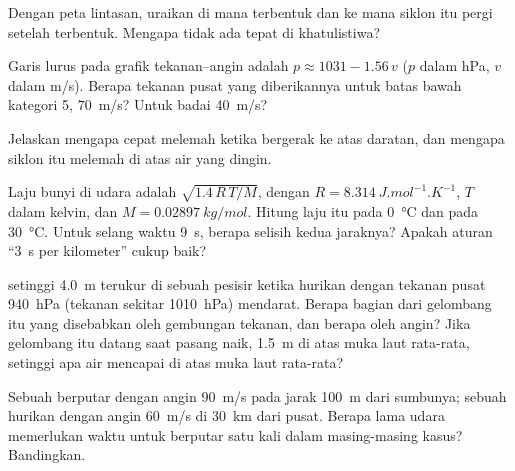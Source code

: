 \begin{exercise}[$\star\star$]\label{exo:g10:storms-and-cyclones:9}
Dengan peta lintasan, uraikan di mana  terbentuk dan ke mana
siklon itu pergi setelah terbentuk. Mengapa  tidak ada tepat di
khatulistiwa?
\end{exercise}

\begin{exercise}[$\star\star$]\label{exo:g10:storms-and-cyclones:10}
Garis lurus pada grafik tekanan--angin adalah $p \approx 1031 - 1.56\,v$
($p$ dalam \unit{hPa}, $v$ dalam \unit{m/s}). Berapa tekanan pusat yang
diberikannya untuk batas bawah kategori 5, \qty{70}{m/s}? Untuk badai
\qty{40}{m/s}?
\end{exercise}

\begin{exercise}[$\star\star$]\label{exo:g10:storms-and-cyclones:11}
Jelaskan mengapa  cepat melemah ketika bergerak ke atas daratan,
dan mengapa siklon itu melemah di atas air yang dingin.
\end{exercise}

\begin{exercise}[$\star\star\star$]\label{exo:g10:storms-and-cyclones:12}
Laju bunyi di udara adalah $\sqrt{1.4\,R\,T/M}$, dengan $R =
\qty{8.314}{J.mol^{-1}.K^{-1}}$, $T$ dalam kelvin, dan $M =
\qty{0.02897}{kg/mol}$. Hitung laju itu pada \qty{0}{\degreeCelsius} dan pada
\qty{30}{\degreeCelsius}. Untuk selang waktu \qty{9}{s}, berapa selisih kedua
jaraknya? Apakah aturan ``\qty{3}{s} per kilometer'' cukup baik?
\end{exercise}

\begin{exercise}[$\star\star\star$]\label{exo:g10:storms-and-cyclones:13}
 setinggi \qty{4.0}{m} terukur di sebuah pesisir ketika hurikan
dengan tekanan pusat \qty{940}{hPa} (tekanan sekitar \qty{1010}{hPa}) mendarat.
Berapa bagian dari gelombang itu yang disebabkan oleh gembungan tekanan, dan
berapa oleh angin? Jika gelombang itu datang saat pasang naik, \qty{1.5}{m} di
atas muka laut rata-rata, setinggi apa air mencapai di atas muka laut
rata-rata?
\end{exercise}

\begin{exercise}[$\star\star\star$]\label{exo:g10:storms-and-cyclones:14}
Sebuah  berputar dengan angin \qty{90}{m/s} pada jarak \qty{100}{m}
dari sumbunya; sebuah hurikan dengan angin \qty{60}{m/s} di 
\qty{30}{km} dari pusat. Berapa lama udara memerlukan waktu untuk berputar satu
kali dalam masing-masing kasus? Bandingkan.
\end{exercise}

